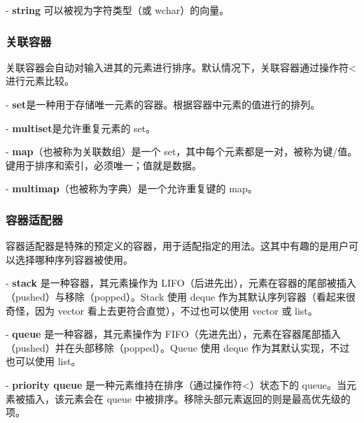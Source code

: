 \documentclass[../../LearnCpp.tex]{subfiles}
\begin{document}
- \textbf{string} 可以被视为字符类型（或 wchar）的向量。

\subsubsection*{关联容器}

关联容器会自动对输入进其的元素进行排序。默认情况下，关联容器通过操作符< 进行元素比较。

- \textbf{set}是一种用于存储唯一元素的容器。根据容器中元素的值进行的排列。

- \textbf{multiset}是允许重复元素的 set。

- \textbf{map}（也被称为关联数组）是一个 set，其中每个元素都是一对，被称为键/值。键用于排序和索引，必须唯一；值就是数据。

- \textbf{multimap}（也被称为字典）是一个允许重复键的 map。

\subsubsection*{容器适配器}

容器适配器是特殊的预定义的容器，用于适配指定的用法。这其中有趣的是用户可以选择哪种序列容器被使用。

- \textbf{stack} 是一种容器，其元素操作为 LIFO（后进先出），元素在容器的尾部被插入（pushed）与移除（popped）。Stack 使用 deque 作为其默认序列容器（看起来很奇怪，因为 vector 看上去更符合直觉），不过也可以使用 vector 或 list。

- \textbf{queue} 是一种容器，其元素操作为 FIFO（先进先出），元素在容器尾部插入（pushed）并在头部移除（popped）。Queue 使用 deque 作为其默认实现，不过也可以使用 list。

- \textbf{priority queue} 是一种元素维持在排序（通过操作符<）状态下的 queue。当元素被插入，该元素会在 queue 中被排序。移除头部元素返回的则是最高优先级的项。
\end{document}

